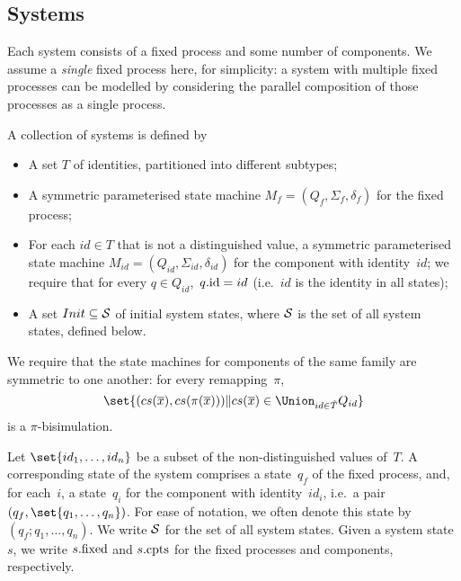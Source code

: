 \subsection{Systems}

Each system consists of a fixed process and some number of components.  We
assume a \emph{single} fixed process here, for simplicity: a system with
multiple fixed processes can be modelled by considering the parallel
composition of those processes as a single process.

\begin{definition}
A collection of systems is defined by
%
\begin{itemize}
\item A set $T$ of identities, partitioned into different subtypes;

\item A symmetric parameterised state machine $M_f = (Q_f, \Sigma_f,
  \delta_f)$ for the fixed process;

\item For each $id \in T$ that is not a distinguished value, a symmetric
  parameterised state machine $M_{id} = (Q_{id}, \Sigma_{id}, \delta_{id})$
  for the component with identity~$id$; we require that for every $q \in
  Q_{id}$,\, $q.\id = id$ (i.e.~$id$ is the identity in all states);

\item A set $Init \subseteq \S$ of initial system states, where $\S$ is the
  set of all system states, defined below. 
\end{itemize}

We require that the state machines for components of the same family are
symmetric to one another: for every remapping~$\pi$,\,
\[
\set{ (cs(\vec{x}), cs(\pi(\vec{x}))) \| 
  cs(\vec{x}) \in \textstyle\Union_{id \in \hat{T}} Q_{id}}
\]
is a $\pi$-bisimulation.

Let $\set{id_1,\ldots,id_n}$ be a subset of the non-distinguished
values of~$T$.  A corresponding state of the system comprises a state~$q_f$ of
the fixed process, and, for each~$i$, a state~$q_i$ for the component with
identity~$id_i$, i.e.~a pair $(q_f, \set{q_1,\ldots,q_n})$.  For ease of
notation, we often denote this state by \( (q_f; q_1,\ldots,q_n) \). We write
$\S$ for the set of all system states.  Given a system state~$s$, we write
$s.\fixed$ and $s.\cpt$ for the fixed processes and components, respectively.


\end{definition}
